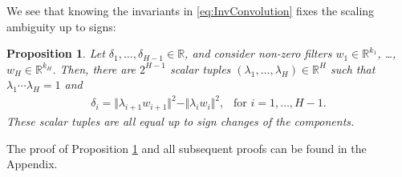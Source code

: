 \documentclass[twoside]{article}
\newtheorem{proposition}[theorem]{Proposition}
\theoremstyle{definition}
\theoremstyle{remark}
\begin{document}
We see that knowing the invariants in \eqref{eq:InvConvolution} fixes the scaling ambiguity up to signs:
\begin{proposition}\label{prop:correctScaling}
    Let $\delta_1, \ldots, \delta_{H-1} \in \mathbb{R}$, and consider non-zero filters $w_1 \in  \mathbb{R}^{k_1}$, \ldots, $w_H \in \mathbb{R}^{k_H}$.
    Then, there are $2^{H-1}$ scalar tuples $(\lambda_1, \ldots, \lambda_H) \in \mathbb{R}^H$ such that $\lambda_1 \cdots \lambda_H = 1$ and 
    \begin{align*}
        \delta_i = \Vert \lambda_{i+1} w_{i+1} \Vert^2 -  \Vert \lambda_i w_{i} \Vert^2, \ \  \text{ for } i = 1, \ldots, H-1.
    \end{align*}
    These scalar tuples are all equal up to sign changes of the components.
\end{proposition}
The proof of Proposition \ref{prop:correctScaling} and all subsequent proofs can be found in the Appendix.
\end{document}
